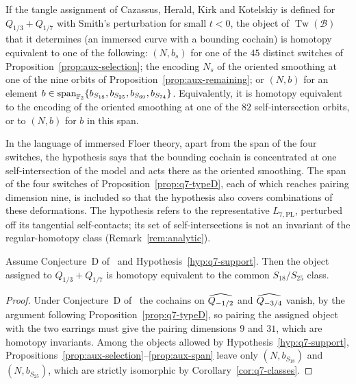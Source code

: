 \begin{hypothesis}[$q=7$ local support]\label{hyp:q7-support}
If the tangle assignment of Cazassus, Herald, Kirk and Kotelskiy is defined for $Q_{1/3}+Q_{1/7}$ with
Smith's perturbation for small
$t<0$, the object of $\operatorname{Tw}(\mathcal B)$ that it determines (an immersed curve with a
bounding cochain) is homotopy equivalent to one of the following: $(N,b_s)$ for one of the $45$
distinct switches of Proposition~\ref{prop:aux-selection}; the encoding $N_s$ of the oriented smoothing
at one of the nine orbits of Proposition~\ref{prop:aux-remaining}; or $(N,b)$ for an element
$b\in\operatorname{span}_{\mathbb{F}_2}\{b_{S_{18}},b_{S_{25}},b_{S_{69}},b_{S_{74}}\}$.  Equivalently, it is
homotopy equivalent to the encoding of the oriented smoothing at one of the $82$ self-intersection
orbits, or to $(N,b)$ for $b$ in this span.
\end{hypothesis}

In the language of immersed Floer theory, apart from the span of the four switches, the hypothesis says
that the bounding cochain is concentrated at one self-intersection of the model and acts there as the oriented smoothing.  The span of the four switches of Proposition~\ref{prop:q7-typeD}, each of which reaches pairing
dimension nine, is included so that the hypothesis also covers combinations of these deformations.  The
hypothesis refers to the representative $L_{7,\mathrm{PL}}$, perturbed off its tangential
self-contacts; its set of self-intersections is not an invariant of the regular-homotopy class
(Remark~\ref{rem:analytic}).

\begin{corollary}\label{cor:aux-conditional}
Assume Conjecture~D of~\cite{CHKK} and Hypothesis~\ref{hyp:q7-support}.  Then the
object assigned to $Q_{1/3}+Q_{1/7}$ is homotopy equivalent to the common $S_{18}/S_{25}$ class.
\end{corollary}

\begin{proof}
Under Conjecture~D of~\cite{CHKK} the cochains on $\widehat{Q_{-1/2}}$ and $\widehat{Q_{-3/4}}$ vanish, by the argument
following Proposition~\ref{prop:q7-typeD}, so pairing the assigned object with the two earrings must give
the pairing dimensions $9$ and $31$, which are homotopy invariants.  Among the objects allowed by
Hypothesis~\ref{hyp:q7-support}, Propositions~\ref{prop:aux-selection}--\ref{prop:aux-span} leave only
$(N,b_{S_{18}})$ and $(N,b_{S_{25}})$, which are strictly isomorphic by Corollary~\ref{cor:q7-classes}.
\end{proof}


